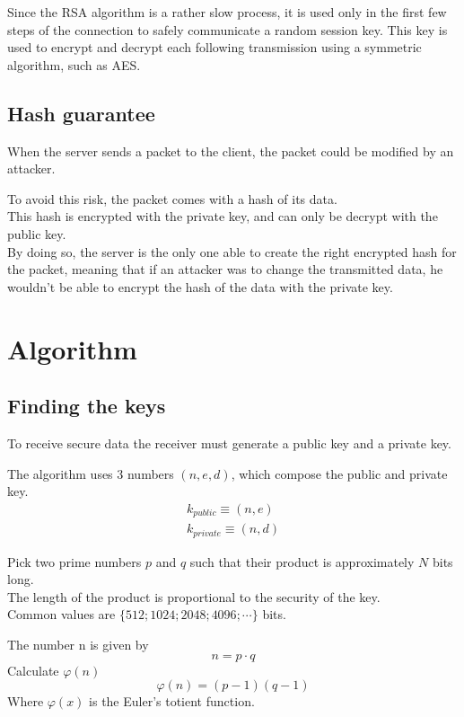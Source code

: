 \documentclass{article}
\begin{document}
Since the RSA algorithm is a rather slow process, it is used only in the first few steps of the connection to safely communicate a random session key.
This key is used to encrypt and decrypt each following transmission using a symmetric algorithm, such as AES.

\subsection{Hash guarantee}

When the server sends a packet to the client, the packet could be modified by an attacker.

To avoid this risk, the packet comes with a hash of its data.\\
This hash is encrypted with the private key, and can only be decrypt with the public key.\\
By doing so, the server is the only one able to create the right encrypted hash for the packet, meaning that if an attacker was to change the transmitted data, he wouldn't be able to encrypt the hash of the data with the private key.

\pagebreak

\section{Algorithm}

\subsection{Finding the keys}

To receive secure data the receiver must generate a public key and a private key.

The algorithm uses 3 numbers \((n,e,d)\), which compose the public and private key.
\begin{align*}
	k_{public}\equiv(n,e)\\
	k_{private}\equiv(n,d)
\end{align*}

Pick two prime numbers \(p\) and \(q\) such that their product is approximately \(N\) bits long.\\
The length of the product is proportional to the security of the key.\\
Common values are \(\{512;1024;2048;4096;\cdots\}\) bits.

The number n is given by
\[
	n=p\cdot q
\]
Calculate \(\varphi(n)\)
\[
	\varphi(n)=(p-1)(q-1)
\]
Where \(\varphi(x)\) is the Euler's totient function.
\end{document}
